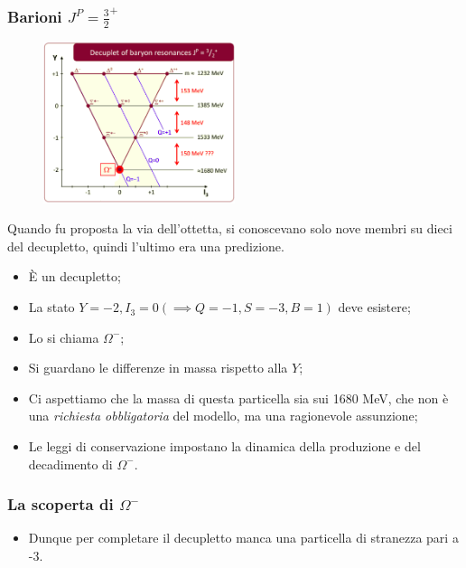 \subsubsection{Barioni $J^P=\frac32^+$}
\begin{figure}[H]
    \centering
    \includegraphics[width=0.5\textwidth]{immagini/fig_baryon_32_piu.png}
\end{figure}
Quando fu proposta la via dell'ottetta, si conoscevano solo nove membri su dieci del decupletto, quindi l'ultimo era una predizione.
\begin{itemize}
\item È un decupletto;
\item La stato $Y=-2,I_3=0(\implies Q=-1, S=-3, B=1)$ deve esistere;
\item Lo si chiama $\Omega^-$;
\item Si guardano le differenze in massa rispetto alla $Y$;
\item Ci aspettiamo che la massa di questa particella sia sui 1680 MeV, che non è una \textit{richiesta obbligatoria} del modello, ma una ragionevole assunzione;
\item Le leggi di conservazione impostano la dinamica della produzione e del decadimento di $\Omega^-$.
\end{itemize}
\subsubsection{La scoperta di $\Omega^-$}
\begin{itemize}
\item Dunque per completare il decupletto manca una particella di stranezza pari a -3.
\end{itemize}